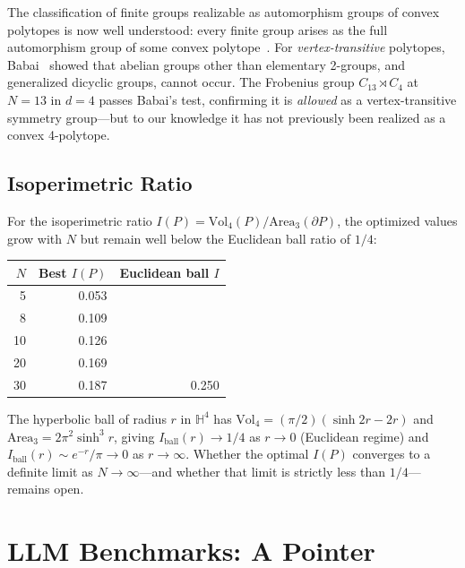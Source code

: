 \documentclass[11pt]{article}
\begin{document}
The classification of finite groups realizable as automorphism groups
of convex polytopes is now well understood:
every finite group arises as the full automorphism group of some
convex polytope~\cite{SchulteWilliams2015,Doignon2018}.
For \emph{vertex-transitive} polytopes, Babai~\cite{Babai1977}
showed that abelian groups other than elementary 2-groups, and
generalized dicyclic groups, cannot occur.
The Frobenius group $C_{13} \rtimes C_4$ at $N = 13$ in $d = 4$
passes Babai's test, confirming it is \emph{allowed} as a
vertex-transitive symmetry group---but to our knowledge it has
not previously been realized as a convex 4-polytope.

\subsection{Isoperimetric Ratio}

For the isoperimetric ratio $I(P) = \mathrm{Vol}_4(P) / \mathrm{Area}_3(\partial P)$,
the optimized values grow with $N$ but remain well below the Euclidean
ball ratio of $1/4$:

\begin{center}
\begin{tabular}{r r r}
\toprule
$N$ & Best $I(P)$ & Euclidean ball $I$ \\
\midrule
5  & 0.053 & \\
8  & 0.109 & \\
10 & 0.126 & \\
20 & 0.169 & \\
30 & 0.187 & 0.250 \\
\bottomrule
\end{tabular}
\end{center}

The hyperbolic ball of radius $r$ in $\mathbb{H}^4$ has
$\mathrm{Vol}_4 = (\pi/2)(\sinh 2r - 2r)$ and
$\mathrm{Area}_3 = 2\pi^2 \sinh^3 r$, giving
$I_{\mathrm{ball}}(r) \to 1/4$ as $r \to 0$ (Euclidean regime)
and $I_{\mathrm{ball}}(r) \sim e^{-r}/\pi \to 0$ as $r \to \infty$.
Whether the optimal $I(P)$ converges to a definite limit as
$N \to \infty$---and whether that limit is strictly less than
$1/4$---remains open.

\section{LLM Benchmarks: A Pointer}
\label{sec:llm_benchmark}
\end{document}
